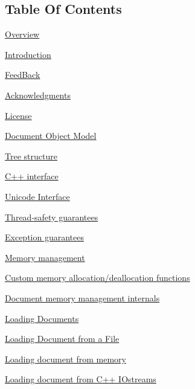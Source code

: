 \hypertarget{XMLManual_XMLTOC}{}\subsection{Table Of Contents}\label{XMLManual_XMLTOC}

\begin{DoxyItemize}
\item \hyperlink{XMLManual_XMLOverview}{Overview}
\begin{DoxyItemize}
\item \hyperlink{XMLManual_XMLIntroduction}{Introduction}
\item \hyperlink{XMLManual_XMLFeedBack}{FeedBack}
\item \hyperlink{XMLManual_XMLAcknowledgments}{Acknowledgments}
\item \hyperlink{XMLManual_XMLLicense}{License}
\end{DoxyItemize}
\item \hyperlink{XMLManual_XMLDOM}{Document Object Model}
\begin{DoxyItemize}
\item \hyperlink{XMLManual_XMLTreeStructure}{Tree structure}
\item \hyperlink{XMLManual_XMLInterface}{C++ interface}
\item \hyperlink{XMLManual_XMLUnicode}{Unicode Interface}
\item \hyperlink{XMLManual_XMLThreadSafety}{Thread-\/safety guarantees}
\item \hyperlink{XMLManual_XMLExceptionSafety}{Exception guarantees}
\item \hyperlink{XMLManual_XMLMemory}{Memory management}
\begin{DoxyItemize}
\item \hyperlink{XMLManual_XMLCustomAlloc}{Custom memory allocation/deallocation functions}
\item \hyperlink{XMLManual_XMLMemoryInternals}{Document memory management internals}
\end{DoxyItemize}
\end{DoxyItemize}
\item \hyperlink{XMLManual_XMLLoading}{Loading Documents}
\begin{DoxyItemize}
\item \hyperlink{XMLManual_XMLLoadingFiles}{Loading Document from a File}
\item \hyperlink{XMLManual_XMLLoadingFromMemory}{Loading document from memory}
\item \hyperlink{XMLManual_XMLLoadingStreams}{Loading document from C++ IOstreams}

\end{DoxyItemize}
\end{DoxyItemize}
